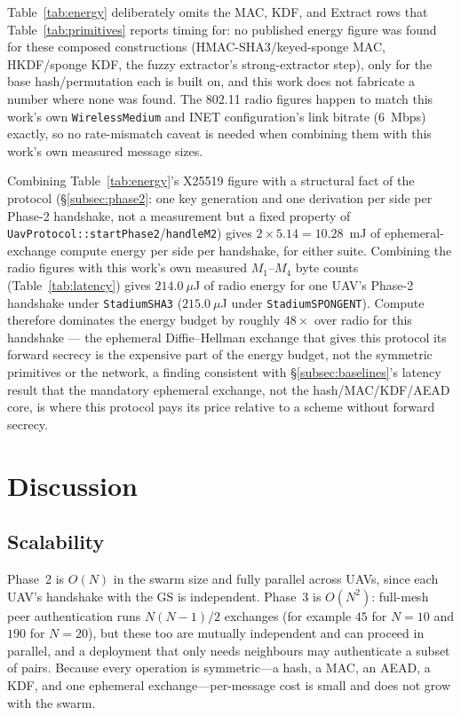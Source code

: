 \documentclass[11pt,a4paper]{article}
\begin{document}
Table~\ref{tab:energy} deliberately omits the MAC, KDF, and Extract rows that
Table~\ref{tab:primitives} reports timing for: no published energy figure was
found for these composed constructions (HMAC-SHA3/keyed-sponge MAC, HKDF/sponge
KDF, the fuzzy extractor's strong-extractor step), only for the base
hash/permutation each is built on, and this work does not fabricate a number
where none was found. The 802.11 radio figures happen to match this work's own
\texttt{WirelessMedium} and INET configuration's link bitrate ($6$~Mbps)
exactly, so no rate-mismatch caveat is needed when combining them with this
work's own measured message sizes.

Combining Table~\ref{tab:energy}'s X25519 figure with a structural fact of the
protocol (\S\ref{subsec:phase2}: one key generation and one derivation per side
per Phase-2 handshake, not a measurement but a fixed property of
\texttt{UavProtocol::startPhase2}/\texttt{handleM2}) gives $2 \times 5.14 =
10.28$~mJ of ephemeral-exchange compute energy per side per handshake, for
either suite. Combining the radio figures with this work's own measured $M_1$--$M_4$
byte counts (Table~\ref{tab:latency}) gives $214.0~\mu$J of radio energy for one
UAV's Phase-2 handshake under \texttt{StadiumSHA3} ($215.0~\mu$J under
\texttt{StadiumSPONGENT}). Compute therefore dominates the energy budget by
roughly $48\times$ over radio for this handshake --- the ephemeral
Diffie--Hellman exchange that gives this protocol its forward secrecy is the
expensive part of the energy budget, not the symmetric primitives or the
network, a finding consistent with \S\ref{subsec:baselines}'s latency result
that the mandatory ephemeral exchange, not the hash/MAC/KDF/AEAD core, is where
this protocol pays its price relative to a scheme without forward secrecy.


\section{Discussion}
\label{sec:discussion}

\subsection{Scalability}
Phase~2 is $O(N)$ in the swarm size and fully parallel across UAVs, since each
UAV's handshake with the GS is independent. Phase~3 is $O(N^2)$: full-mesh peer
authentication runs $N(N-1)/2$ exchanges (for example $45$ for $N=10$ and $190$
for $N=20$), but these too are mutually independent and can proceed in
parallel, and a deployment that only needs neighbours may authenticate a subset
of pairs. Because every operation is symmetric---a hash, a MAC, an AEAD, a KDF,
and one ephemeral exchange---per-message cost is small and does not grow with
the swarm.
\end{document}
